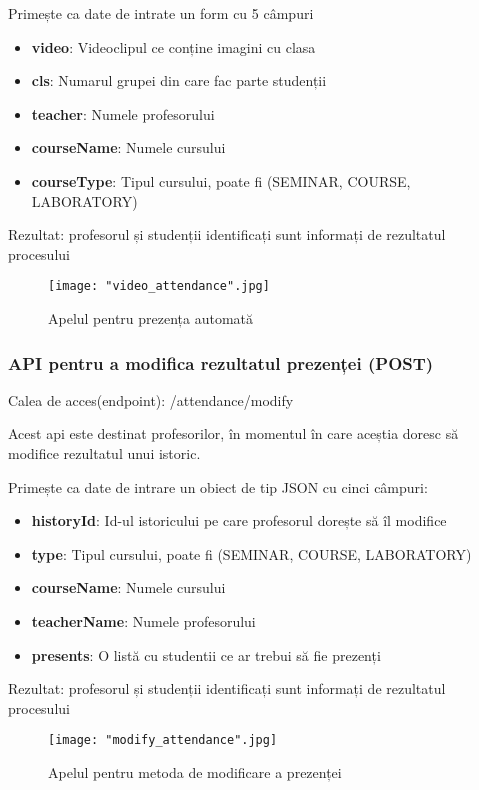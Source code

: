 \documentclass[a4paper, 12pt]{article}
\begin{document}
	\bigskip
	Primește ca date de intrate un form cu 5 câmpuri
	\begin{itemize}
		\item \textbf{video}: Videoclipul ce conține imagini cu clasa
		\item \textbf{cls}: Numarul  grupei din care fac parte studenții
		\item \textbf{teacher}: Numele profesorului
		\item \textbf{courseName}: Numele cursului
		\item \textbf{courseType}: Tipul cursului, poate fi (SEMINAR, COURSE, LABORATORY)
	\end{itemize}
	
	\quad Rezultat: profesorul și studenții identificați sunt informați de rezultatul procesului
	\begin{figure}[!htb]
		\centering
		\texttt{[image: "video\_attendance".jpg]}
		\caption{Apelul pentru prezența automată}\label{fig:video_attendance}
	\end{figure}
	\bigskip
	
	\subsubsection{API pentru a modifica rezultatul prezenței (POST) } 
	
	\bigskip
	\quad\space\space Calea de acces(endpoint): /attendance/modify 
	
	Acest api este destinat profesorilor, în momentul în care aceștia doresc să modifice rezultatul unui istoric.
	
	\bigskip
	Primește ca date de intrare un obiect de tip JSON\textbf{\cite{bray2017javascript}} cu cinci câmpuri:
	
	\begin{itemize}
		\item \textbf{historyId}: Id-ul istoricului pe care profesorul dorește să îl modifice
		\item \textbf{type}: Tipul cursului, poate fi (SEMINAR, COURSE, LABORATORY)
		\item \textbf{courseName}: Numele cursului
		\item \textbf{teacherName}: Numele profesorului
		\item \textbf{presents}: O listă cu studentii ce ar trebui să fie prezenți
	\end{itemize}
	
	\quad Rezultat: profesorul și studenții identificați sunt informați de rezultatul procesului
	\begin{figure}[!htb]
		\centering
		\texttt{[image: "modify\_attendance".jpg]}
		\caption{Apelul pentru metoda de modificare a prezenței}\label{fig:modify_attendance}
	\end{figure}
	\bigskip
\end{document}
